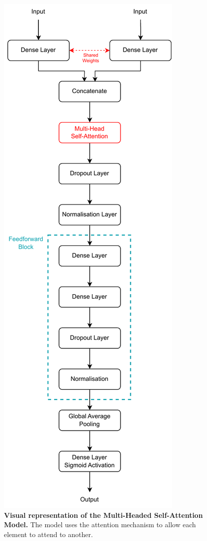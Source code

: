 \begin{figure}[tbh!]
\centering
\includegraphics[scale=0.8]{Figures/AttentionModel.drawio.pdf}
\caption{\textbf{Visual representation of the Multi-Headed Self-Attention Model.} The model uses the attention mechanism to allow each element to attend to another. }\label{fig:AttentionModelDesign}
\end{figure}


